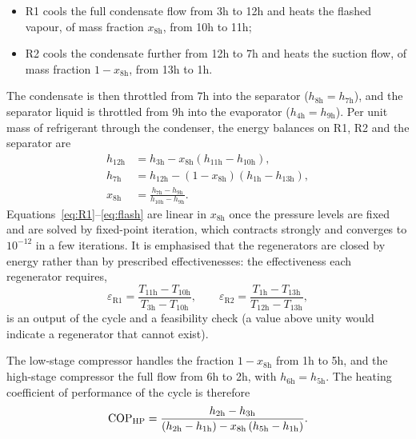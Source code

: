 \begin{itemize}[leftmargin=1.8em,itemsep=1pt]
\item R1 cools the full condensate flow from 3h to 12h and heats the flashed
  vapour, of mass fraction $x_\mathrm{8h}$, from 10h to 11h;
\item R2 cools the condensate further from 12h to 7h and heats the suction
  flow, of mass fraction $1-x_\mathrm{8h}$, from 13h to 1h.
\end{itemize}

\noindent
The condensate is then throttled from 7h into the separator
($h_\mathrm{8h}=h_\mathrm{7h}$), and the separator liquid is throttled from 9h
into the evaporator ($h_\mathrm{4h}=h_\mathrm{9h}$). Per unit mass of
refrigerant through the condenser, the energy balances on R1, R2 and the
separator are
\begin{align}
  h_\mathrm{12h}&=h_\mathrm{3h}-x_\mathrm{8h}\left(h_\mathrm{11h}-h_\mathrm{10h}\right),
  \label{eq:R1}\\
  h_\mathrm{7h}&=h_\mathrm{12h}-\left(1-x_\mathrm{8h}\right)
                 \left(h_\mathrm{1h}-h_\mathrm{13h}\right),
  \label{eq:R2}\\
  x_\mathrm{8h}&=\frac{h_\mathrm{7h}-h_\mathrm{9h}}{h_\mathrm{10h}-h_\mathrm{9h}}.
  \label{eq:flash}
\end{align}
Equations~\eqref{eq:R1}--\eqref{eq:flash} are linear in $x_\mathrm{8h}$ once
the pressure levels are fixed and are solved by fixed-point iteration, which
contracts strongly and converges to $10^{-12}$ in a few iterations. It is
emphasised that the regenerators are closed by energy rather than by
prescribed effectivenesses: the effectiveness each regenerator requires,
\begin{equation}
  \varepsilon_\mathrm{R1}=\frac{T_\mathrm{11h}-T_\mathrm{10h}}{T_\mathrm{3h}-T_\mathrm{10h}},
  \qquad
  \varepsilon_\mathrm{R2}=\frac{T_\mathrm{1h}-T_\mathrm{13h}}{T_\mathrm{12h}-T_\mathrm{13h}},
  \label{eq:eps-R}
\end{equation}
is an output of the cycle and a feasibility check (a value above unity would
indicate a regenerator that cannot exist). 

The low-stage compressor handles the fraction $1-x_\mathrm{8h}$ from 1h to
5h, and the high-stage compressor the full flow from 6h to 2h, with
$h_\mathrm{6h}=h_\mathrm{5h}$. The heating coefficient of performance of the
cycle is therefore
\begin{equation}
  \mathrm{COP}_{\mathrm{HP}}=\frac{h_\mathrm{2h}-h_\mathrm{3h}}
  {\left(h_\mathrm{2h}-h_\mathrm{1h}\right)
   -x_\mathrm{8h}\left(h_\mathrm{5h}-h_\mathrm{1h}\right)}.
  \label{eq:cop}
\end{equation}

